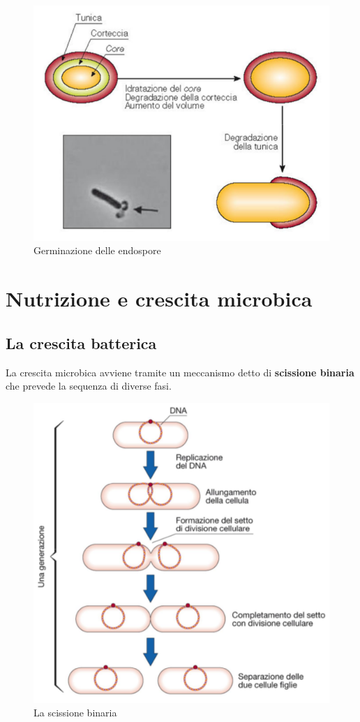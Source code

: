 \documentclass[11pt]{book}
\begin{document}
\begin{figure}[htp]
\centering
\includegraphics[scale=0.4]{img/Germinazione della spora.png}
\caption{Germinazione delle endospore}
\label{}
\end{figure}


\chapter{Nutrizione e crescita microbica}
\section{La crescita batterica}
La crescita microbica avviene tramite un meccanismo detto di \textbf{scissione binaria} che prevede la sequenza di diverse fasi.

\begin{figure}[htp]
\centering
\includegraphics[scale=0.5]{img/Scissione binaria.png}
\caption{La scissione binaria}
\label{}
\end{figure}
\end{document}
